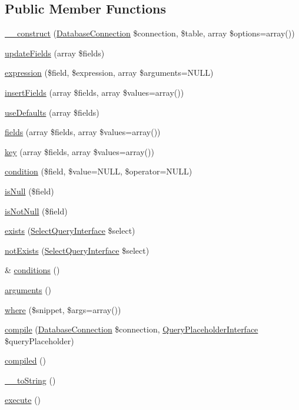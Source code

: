 \subsection*{Public Member Functions}
\begin{DoxyCompactItemize}
\item 
\hyperlink{classMergeQuery_a05ba5cf13796317567a0344cf58a028c}{\_\-\_\-construct} (\hyperlink{classDatabaseConnection}{DatabaseConnection} \$connection, \$table, array \$options=array())
\item 
\hyperlink{classMergeQuery_ad5b51b48eaec3821181cf8e6c09bf29e}{updateFields} (array \$fields)
\item 
\hyperlink{classMergeQuery_a09f35077e2adc871dcdd75efedbeabe0}{expression} (\$field, \$expression, array \$arguments=NULL)
\item 
\hyperlink{classMergeQuery_a1c1fef20258dad469a0853fdaddaae4e}{insertFields} (array \$fields, array \$values=array())
\item 
\hyperlink{classMergeQuery_a630cdd152352b1229cc712ec261139cf}{useDefaults} (array \$fields)
\item 
\hyperlink{classMergeQuery_ae58f2865c72dfc4c310ec4c17fd4e72d}{fields} (array \$fields, array \$values=array())
\item 
\hyperlink{classMergeQuery_aa34f8ac97b0571d49fbc20557dfce97b}{key} (array \$fields, array \$values=array())
\item 
\hyperlink{classMergeQuery_a40d55b36952248da6d8eabb0eb1a8430}{condition} (\$field, \$value=NULL, \$operator=NULL)
\item 
\hyperlink{classMergeQuery_a010c4f710e0e242d9d89383a49573376}{isNull} (\$field)
\item 
\hyperlink{classMergeQuery_a6eda0759442dcb9cfa940e5ced5cc7ba}{isNotNull} (\$field)
\item 
\hyperlink{classMergeQuery_a0a92a08ad6933ecc4a796e9d50ea85f5}{exists} (\hyperlink{interfaceSelectQueryInterface}{SelectQueryInterface} \$select)
\item 
\hyperlink{classMergeQuery_a3749f7ccb2e71b8ff1570161418cbf2b}{notExists} (\hyperlink{interfaceSelectQueryInterface}{SelectQueryInterface} \$select)
\item 
\& \hyperlink{classMergeQuery_a759f840d106e79a119d9130d09123b8d}{conditions} ()
\item 
\hyperlink{classMergeQuery_aa059b4fd2916e10075582091bfa03975}{arguments} ()
\item 
\hyperlink{classMergeQuery_a1d46b2fc285ec9f402ac53800e3cd58f}{where} (\$snippet, \$args=array())
\item 
\hyperlink{classMergeQuery_a33436167b6e2ddc710b2a51db146ea67}{compile} (\hyperlink{classDatabaseConnection}{DatabaseConnection} \$connection, \hyperlink{interfaceQueryPlaceholderInterface}{QueryPlaceholderInterface} \$queryPlaceholder)
\item 
\hyperlink{classMergeQuery_ab6c0c905db976734e61d6ef997bd3a6a}{compiled} ()
\item 
\hyperlink{classMergeQuery_a66c98a8761c91bb633c4ea09ce0c467c}{\_\-\_\-toString} ()
\item 
\hyperlink{classMergeQuery_aeea46fdb119752efd2048d66b9fe8de8}{execute} ()
\end{DoxyCompactItemize}
